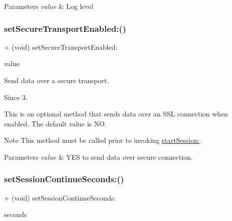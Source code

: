\begin{DoxyParams}{Parameters}
{\em value} & Log level \\
\hline
\end{DoxyParams}
\mbox{\label{interfaceFlurry_a085d6860e85344caa6c7ee201f2bc953}} 
\subsubsection{\texorpdfstring{set\+Secure\+Transport\+Enabled\+:()}{setSecureTransportEnabled:()}}
{\footnotesize\ttfamily + (void) set\+Secure\+Transport\+Enabled\+: \begin{DoxyParamCaption}\item[{(B\+O\+OL)}]{value }\end{DoxyParamCaption}}



Send data over a secure transport. 

\begin{DoxySince}{Since}
3.
\end{DoxySince}
This is an optional method that sends data over an S\+SL connection when enabled. The default value is {\ttfamily NO}.

\begin{DoxyNote}{Note}
This method must be called prior to invoking \hyperlink{interfaceFlurry_aeadfa23545c392ffd46db448b6a95809}{start\+Session\+:}.
\end{DoxyNote}

\begin{DoxyParams}{Parameters}
{\em value} & {\ttfamily Y\+ES} to send data over secure connection. \\
\hline
\end{DoxyParams}
\mbox{\label{interfaceFlurry_a1b79d4d804074f4b66f3434d9318ceee}} 
\subsubsection{\texorpdfstring{set\+Session\+Continue\+Seconds\+:()}{setSessionContinueSeconds:()}}
{\footnotesize\ttfamily + (void) set\+Session\+Continue\+Seconds\+: \begin{DoxyParamCaption}\item[{(int)}]{seconds }\end{DoxyParamCaption}}



